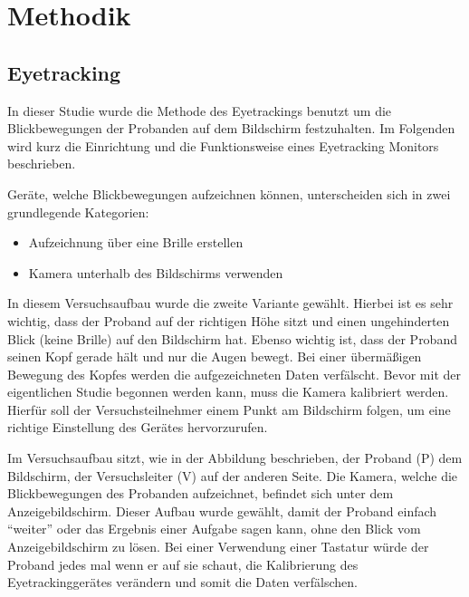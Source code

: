 \chapter{Methodik}

\section{Eyetracking}

In dieser Studie wurde die Methode des Eyetrackings benutzt um die Blickbewegungen der Probanden auf dem Bildschirm festzuhalten. Im Folgenden wird kurz die Einrichtung und die Funktionsweise eines Eyetracking Monitors beschrieben. 

Geräte, welche Blickbewegungen aufzeichnen können, unterscheiden sich in zwei grundlegende Kategorien:
    \begin{itemize}
        \item Aufzeichnung über eine Brille erstellen
        \item Kamera unterhalb des Bildschirms verwenden
    \end{itemize}


In diesem Versuchsaufbau wurde die zweite Variante gewählt. Hierbei ist es sehr wichtig, dass der Proband auf der richtigen Höhe sitzt und einen ungehinderten Blick (keine Brille) auf den Bildschirm hat. Ebenso wichtig ist, dass der Proband seinen Kopf gerade hält und nur die Augen bewegt. Bei einer übermäßigen Bewegung des Kopfes werden die aufgezeichneten Daten verfälscht. Bevor mit der eigentlichen Studie begonnen werden kann, muss die Kamera kalibriert werden. Hierfür soll der Versuchsteilnehmer einem Punkt am Bildschirm folgen, um eine richtige Einstellung des Gerätes hervorzurufen. 


Im Versuchsaufbau sitzt, wie in der Abbildung beschrieben, der Proband (P) dem Bildschirm, der Versuchsleiter (V) auf der anderen Seite.
Die Kamera, welche die Blickbewegungen des Probanden aufzeichnet, befindet sich unter dem Anzeigebildschirm. Dieser Aufbau wurde gewählt, damit der Proband einfach ``weiter'' oder das Ergebnis einer Aufgabe sagen kann, ohne den Blick vom Anzeigebildschirm zu lösen. Bei einer Verwendung einer Tastatur würde der Proband jedes mal wenn er auf sie schaut, die Kalibrierung des Eyetrackinggerätes verändern und somit die Daten verfälschen. 

